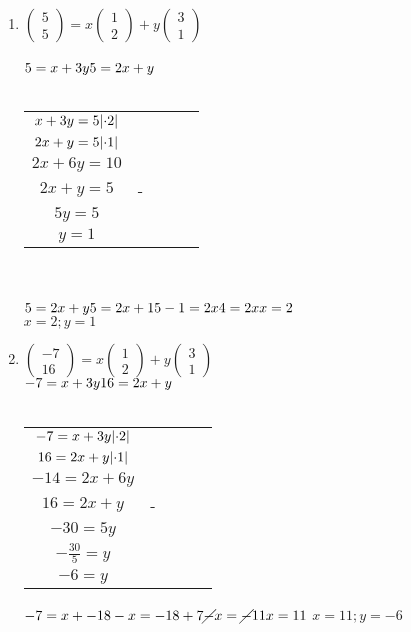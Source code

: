 \documentclass[a4paper]{article}
\begin{document}
\begin{enumerate}[1.]
		\item $\begin{pmatrix}5 \\ 5\end{pmatrix} = x\begin{pmatrix}1 \\ 2\end{pmatrix} + y\begin{pmatrix}3 \\1\end{pmatrix}$\\\\
		$5 = x +3y\\
		5 = 2x + y$\\\\
		\begin{tabular}{c@{\,}c@{\,}c@{\,}c@{\,}c}
			$x + 3y = 5 \abs{\cdot{2}}$\\
			$2x + y = 5 \abs{\cdot{1}}$\\
			\hline
			$2x + 6y = 10$\\
			$2x + y = 5$&-\\
			\hline
			$5y = 5$\\
			$y = 1$
		\end{tabular}
		\\\\$5 = 2x + y\\
		5 = 2x + 1\\
		5 - 1 = 2x\\
		4 = 2x\\
		x = 2$\\
		$x=2 ; y=1$

		\item $\begin{pmatrix} -7 \\ 16 \end{pmatrix}= x\begin{pmatrix}1 \\ 2\end{pmatrix} + y \begin{pmatrix}3 \\ 1\end{pmatrix}$\\
		$-7 = x + 3y\\
		16 = 2x + y$\\\\
		\begin{tabular}{c@{\,}c@{\,}c@{\,}c@{\,}c}
			$-7 = x + 3y \abs{\cdot{2}}$\\
			$16 = 2x + y \abs{\cdot{1}}$\\
			\hline
			$-14 = 2x + 6y$\\
			$16 = 2x + y$&-\\
			\hline
			$-30 = 5y$\\
			$-\frac{30}{5} = y$\\
			$-6 = y$
		\end{tabular}
		$-7 = x + -18\\
		-x = -18 + 7\\
		\cancel{-}x=\cancel{-}11\\
		x = 11\\$
		$x = 11 ; y = -6$


\end{enumerate}
\end{document}
